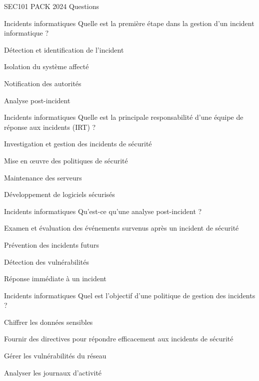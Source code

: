 \documentclass[12pt]{article}
\begin{document}
\begin{quiz}{SEC101 PACK 2024 Questions}
     \begin{multi}[points=1]{Incidents informatiques}
     Quelle est la première étape dans la gestion d'un incident informatique ?
        \item *Détection et identification de l'incident
        \item Isolation du système affecté
        \item Notification des autorités
        \item Analyse post-incident
      \end{multi} 
    
     \begin{multi}[points=1]{Incidents informatiques}
     Quelle est la principale responsabilité d'une équipe de réponse aux incidents (IRT) ?
       
     \item *Investigation et gestion des incidents de sécurité
        \item Mise en œuvre des politiques de sécurité
        \item Maintenance des serveurs
        \item Développement de logiciels sécurisés
      \end{multi} 
    
     \begin{multi}[points=1]{Incidents informatiques}
     Qu'est-ce qu'une analyse post-incident ?
        \item *Examen et évaluation des événements survenus après un incident de sécurité
        \item Prévention des incidents futurs
        \item Détection des vulnérabilités
        \item Réponse immédiate à un incident
      \end{multi} 
    
     \begin{multi}[points=1]{Incidents informatiques}
     Quel est l'objectif d'une politique de gestion des incidents ?
        \item Chiffrer les données sensibles
        \item *Fournir des directives pour répondre efficacement aux incidents de sécurité
        \item Gérer les vulnérabilités du réseau
        \item Analyser les journaux d'activité
      \end{multi} 
    

\end{quiz}
\end{document}
